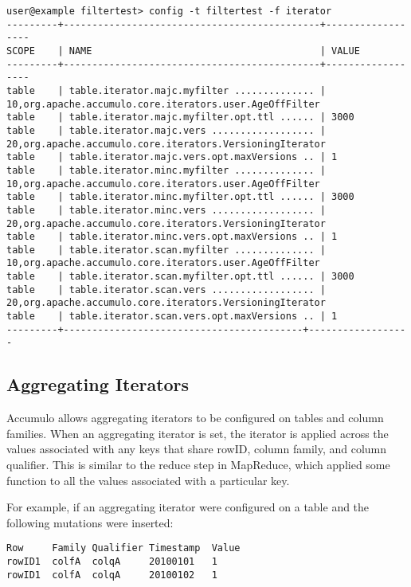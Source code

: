 \small
\begin{verbatim}
user@example filtertest> config -t filtertest -f iterator
---------+---------------------------------------------+------------------
SCOPE    | NAME                                        | VALUE
---------+---------------------------------------------+------------------
table    | table.iterator.majc.myfilter .............. | 10,org.apache.accumulo.core.iterators.user.AgeOffFilter
table    | table.iterator.majc.myfilter.opt.ttl ...... | 3000
table    | table.iterator.majc.vers .................. | 20,org.apache.accumulo.core.iterators.VersioningIterator
table    | table.iterator.majc.vers.opt.maxVersions .. | 1
table    | table.iterator.minc.myfilter .............. | 10,org.apache.accumulo.core.iterators.user.AgeOffFilter
table    | table.iterator.minc.myfilter.opt.ttl ...... | 3000
table    | table.iterator.minc.vers .................. | 20,org.apache.accumulo.core.iterators.VersioningIterator
table    | table.iterator.minc.vers.opt.maxVersions .. | 1
table    | table.iterator.scan.myfilter .............. | 10,org.apache.accumulo.core.iterators.user.AgeOffFilter
table    | table.iterator.scan.myfilter.opt.ttl ...... | 3000
table    | table.iterator.scan.vers .................. | 20,org.apache.accumulo.core.iterators.VersioningIterator
table    | table.iterator.scan.vers.opt.maxVersions .. | 1
---------+------------------------------------------+------------------
\end{verbatim}
\normalsize

\subsection{Aggregating Iterators}

Accumulo allows aggregating iterators to be configured on tables and column
families. When an aggregating iterator is set, the iterator is applied across the values
associated with any keys that share rowID, column family, and column qualifier.
This is similar to the reduce step in MapReduce, which applied some function to all
the values associated with a particular key.

For example, if an aggregating iterator were configured on a table and the following
mutations were inserted:

\small
\begin{verbatim}
Row     Family Qualifier Timestamp  Value
rowID1  colfA  colqA     20100101   1
rowID1  colfA  colqA     20100102   1
\end{verbatim}
\normalsize

